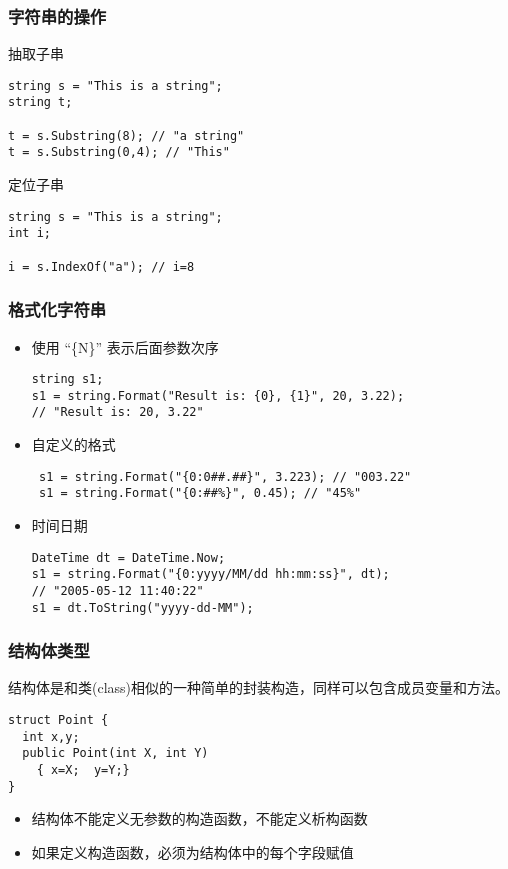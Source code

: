 \begin{frame}[fragile]
\frametitle{字符串的操作}
抽取子串
\begin{lstlisting}
string s = "This is a string";
string t;

t = s.Substring(8); // "a string"
t = s.Substring(0,4); // "This"
\end{lstlisting}

定位子串
\begin{lstlisting}
string s = "This is a string";
int i;

i = s.IndexOf("a"); // i=8
\end{lstlisting}
\end{frame}

\begin{frame}[fragile]
\frametitle{格式化字符串}
\CJKindent
\begin{itemize}
\item 使用 ``\{N\}'' 表示后面参数次序
\begin{lstlisting}
string s1;
s1 = string.Format("Result is: {0}, {1}", 20, 3.22);
// "Result is: 20, 3.22"

\end{lstlisting}
\pause
\item 自定义的格式
\begin{lstlisting}
 s1 = string.Format("{0:0##.##}", 3.223); // "003.22"
 s1 = string.Format("{0:##%}", 0.45); // "45%"
\end{lstlisting}
\pause
\item 时间日期
\begin{lstlisting}
DateTime dt = DateTime.Now;
s1 = string.Format("{0:yyyy/MM/dd hh:mm:ss}", dt);
// "2005-05-12 11:40:22"
s1 = dt.ToString("yyyy-dd-MM");
\end{lstlisting}
\end{itemize}
\end{frame}

\begin{frame}[fragile]
\frametitle{结构体类型}
\CJKindent 结构体是和类(class)相似的一种简单的封装构造，同样可以包含成员变量和方法。
\begin{lstlisting}[escapeinside=<>]
struct Point {
  int x,y;
  public Point(int X, int Y)
    { x=X;  y=Y;}
}
\end{lstlisting}
\begin{itemize}
\item 结构体不能定义无参数的构造函数，不能定义析构函数
\item 如果定义构造函数，必须为结构体中的每个字段赋值
\end{itemize}
\end{frame}

